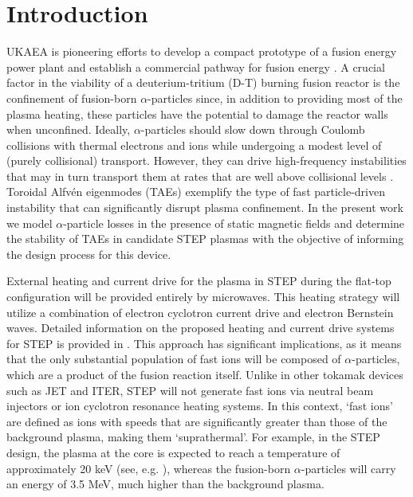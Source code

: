 \documentclass[10pt, a4paper, twoside]{article}
\begin{document}
\setlength{\parindent}{0pt}
\fontsize{10}{13}\selectfont

\section{Introduction}
\label{sec:introduction}

UKAEA is pioneering efforts to develop a compact prototype of a fusion energy power plant and establish a commercial pathway for fusion energy \cite{nuttall2020, meyer2023, mitchell2023}. A crucial factor in the viability of a deuterium-tritium (D-T) burning fusion reactor is the confinement of fusion-born $\alpha$-particles since, in addition to providing most of the plasma heating, these particles have the potential to damage the reactor walls when unconfined. Ideally, $\alpha$-particles should slow down through Coulomb collisions with thermal electrons and ions while undergoing a modest level of (purely collisional) transport. However, they can drive high-frequency instabilities that may in turn transport them at rates that are well above collisional levels \cite{garcia-munoz2011}. Toroidal Alfv\'en eigenmodes (TAEs) exemplify the type of fast particle-driven instability that can significantly disrupt plasma confinement. In the present work we model $\alpha$-particle losses in the presence of static magnetic fields and determine the stability of TAEs in candidate STEP plasmas with the objective of informing the design process for this device.

External heating and current drive for the plasma in STEP during the flat-top configuration will be provided entirely by microwaves. This heating strategy will utilize a combination of electron cyclotron current drive and electron Bernstein waves. Detailed information on the proposed heating and current drive systems for STEP is provided in \cite{freethy2023}.
This approach has significant implications, as it means that the only substantial population of fast ions will be composed of $\alpha$-particles, which are a product of the fusion reaction itself. Unlike in other tokamak devices such as JET and ITER, STEP will not generate fast ions via neutral beam injectors or ion cyclotron resonance heating systems.
In this context, `fast ions' are defined as ions with speeds that are significantly greater than those of the background plasma, making them `suprathermal'. For example, in the STEP design, the plasma at the core is expected to reach a temperature of approximately 20 keV (see, e.g. \cite{meyer2023,mitchell2023}), whereas the fusion-born $\alpha$-particles will carry an energy of 3.5 MeV, much higher than the background plasma.
\end{document}
